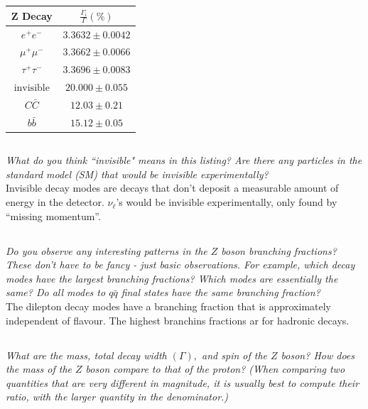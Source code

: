 \documentclass[12pt, letterpaper]{article}
\begin{document}
\begin{center}
\begin{tabular}{ |c||c| } 
\hline \hline
 Z Decay                  & $\frac{\Gamma_i}{\Gamma} \left(\%\right)$\\
 \hline \hline
    ${e^{+} e^{-}}$             & $3.3632 \pm 0.0042$\\
    $\mu^+ \mu^-$              & $3.3662 \pm 0.0066$\\
    $\tau^{+} \tau^-$              & $3.3696 \pm 0.0083$\\
    $\text { invisible }$              & $20.000 \pm 0.055$\\
    $C \bar{C}$                 & $12.03 \pm 0.21$\\
    $b \bar{b}$             & $15.12 \pm 0.05$\\
\hline \hline
\end{tabular}
\end{center}

\subsection{}
\textit{What do you think ``invisible" means in this listing? Are there any particles in the standard model (SM) that would be invisible experimentally?}\\

Invisible decay modes are decays that don't deposit a measurable amount of energy in the detector. $\nu_{\ell}$’s would be invisible experimentally, only found by ``missing momentum”.

\subsection{}
\textit{Do you observe any interesting patterns in the $Z$ boson branching fractions? These don't have to be fancy - just basic observations. For example, which decay modes have the largest branching fractions? Which modes are essentially the same? Do all modes to $q \bar{q}$ final states have the same branching fraction?}\\

The dilepton decay modes have a branching fraction that is approximately independent of flavour. The highest branchins fractions ar for hadronic decays.


\subsection{}
\textit{What are the mass, total decay width $(\Gamma),$ and spin of the $Z$ boson? How does the mass of the $Z$ boson compare to that of the proton? (When comparing two quantities that are very different in magnitude, it is usually best to compute their ratio, with the larger quantity in the denominator.)}\\
\end{document}

